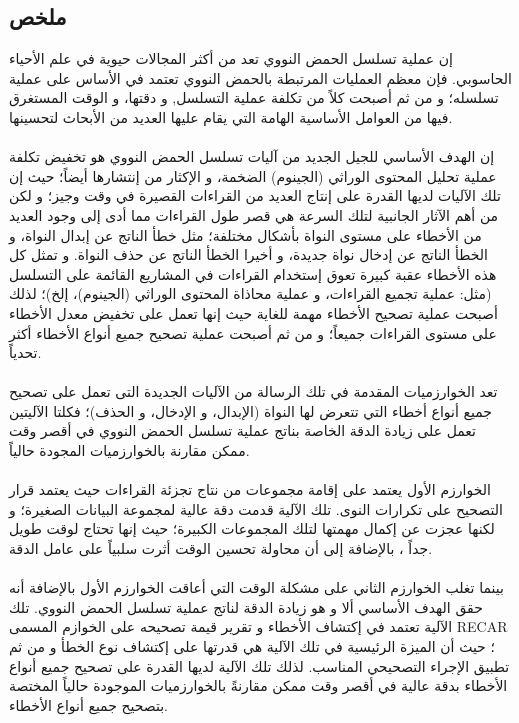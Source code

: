 \documentclass[12pt,openany]{llncs}
\begin{document}
\begin{titlepage}
\section*{ملخص}\thispagestyle{fancy}
إن عملية تسلسل الحمض النووي تعد من أكثر المجالات حيوية في علم الأحياء الحاسوبي. فإن معظم العمليات المرتبطة بالحمض النووي تعتمد في الأساس على عملية تسلسله؛ و من ثم أصبحت كلاً من تكلفة عملية التسلسل, و دقتها، و الوقت المستغرق فيها من العوامل الأساسية الهامة التي يقام عليها العديد من الأبحاث لتحسينها.
\\
\\
إن الهدف الأساسي للجيل الجديد من آليات تسلسل الحمض النووي هو تخفيض تكلفة عملية تحليل المحتوى الوراثي (الجينوم) الضخمة، و الإكثار من إنتشارها أيضاً؛ حيث إن تلك الآليات لديها القدرة على إنتاج العديد من القراءات القصيرة في وقت وجيز؛ و لكن من أهم الآثار الجانبية لتلك السرعة هي قصر طول القراءات مما أدى إلى وجود العديد من الأخطاء على مستوى النواة بأشكال مختلفة؛ مثل خطأ الناتج عن إبدال النواة، و الخطأ الناتج عن إدخال نواة جديدة، و أخيرا الخطأ الناتج عن حذف النواة. و تمثل كل هذه الأخطاء عقبة كبيرة تعوق إستخدام القراءات في المشاريع القائمة على التسلسل (مثل:  عملية تجميع القراءات، و عملية محاذاة المحتوى الوراثي (الجينوم)، إلخ)؛ لذلك أصبحت عملية تصحيح الأخطاء مهمة للغاية حيث إنها تعمل على تخفيض معدل الأخطاء على مستوى القراءات جميعاً؛ و من ثم أصبحت عملية تصحيح جميع أنواع الأخطاء أكثر تحدياً.
\\
\\ 
 تعد الخوارزميات المقدمة في تلك الرسالة من الآليات الجديدة التى تعمل على تصحيح جميع أنواع أخطاء التي تتعرض لها النواة (الإبدال، و الإدخال، و الحذف)؛ فكلتا الآليتين تعمل على زيادة الدقة الخاصة بناتج عملية تسلسل الحمض النووي في أقصر وقت ممكن مقارنة بالخوارزميات المجودة حالياً.
\\
\\
الخوارزم الأول يعتمد على إقامة مجموعات من نتاج تجزئة القراءات حيث يعتمد قرار التصحيح على تكرارات النوى. تلك الآلية قدمت دقة عالية لمجموعة البيانات الصغيرة؛ و لكنها عجزت عن إكمال مهمتها لتلك المجموعات الكبيرة؛ حيث إنها تحتاج لوقت طويل جداً ، بالإضافة إلى أن محاولة تحسين الوقت أثرت سلبياً على عامل الدقة.
\\
\\
 بينما تغلب الخوارزم الثاني على مشكلة الوقت التي أعاقت الخوارزم الأول بالإضافة أنه حقق الهدف الأساسي ألا و هو زيادة الدقة لناتج عملية تسلسل الحمض النووي. تلك الآلية تعتمد في إكتشاف الأخطاء و تقرير قيمة تصحيحه على الخوازم المسمى 
 RECAR 
 ؛ حيث أن الميزة الرئيسية في تلك الآلية هي قدرتها على إكتشاف نوع الخطأ و من ثم تطبيق الإجراء التصحيحي المناسب. لذلك تلك الآلية لديها القدرة على تصحيح جميع أنواع الأخطاء بدقة عالية في أقصر وقت ممكن مقارنةً بالخوارزميات الموجودة حالياً المختصة بتصحيح جميع أنواع الأخطاء.


\end{titlepage}
\end{document}
